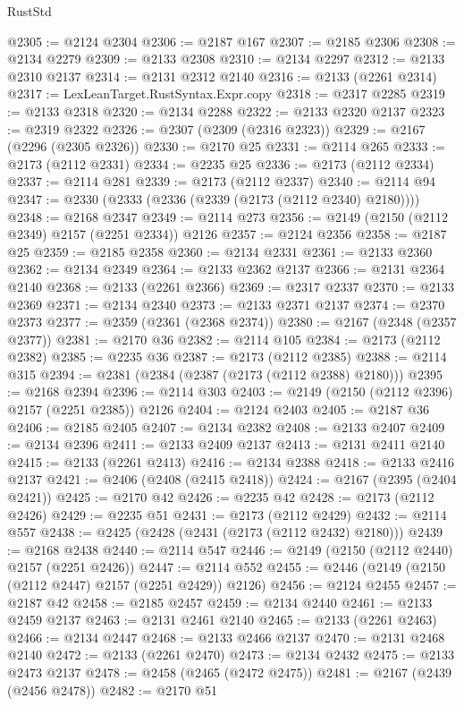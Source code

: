 \begin{lexlean}{RustStd}
\begin{coremodule}
{\begin{coremodule}
{{{{{{{{{{{{{{{{@2305 := @2124 @2304
@2306 := @2187 @167
@2307 := @2185 @2306
@2308 := @2134 @2279
@2309 := @2133 @2308
@2310 := @2134 @2297
@2312 := @2133 @2310 @2137
@2314 := @2131 @2312 @2140
@2316 := @2133 (@2261 @2314)
@2317 := LexLeanTarget.RustSyntax.Expr.copy
@2318 := @2317 @2285
@2319 := @2133 @2318
@2320 := @2134 @2288
@2322 := @2133 @2320 @2137
@2323 := @2319 @2322
@2326 := @2307 (@2309 (@2316 @2323))
@2329 := @2167 (@2296 (@2305 @2326))
@2330 := @2170 @25
@2331 := @2114 @265
@2333 := @2173 (@2112 @2331)
@2334 := @2235 @25
@2336 := @2173 (@2112 @2334)
@2337 := @2114 @281
@2339 := @2173 (@2112 @2337)
@2340 := @2114 @94
@2347 := @2330 (@2333 (@2336 (@2339 (@2173 (@2112 @2340) @2180))))
@2348 := @2168 @2347
@2349 := @2114 @273
@2356 := @2149 (@2150 (@2112 @2349) @2157 (@2251 @2334)) @2126
@2357 := @2124 @2356
@2358 := @2187 @25
@2359 := @2185 @2358
@2360 := @2134 @2331
@2361 := @2133 @2360
@2362 := @2134 @2349
@2364 := @2133 @2362 @2137
@2366 := @2131 @2364 @2140
@2368 := @2133 (@2261 @2366)
@2369 := @2317 @2337
@2370 := @2133 @2369
@2371 := @2134 @2340
@2373 := @2133 @2371 @2137
@2374 := @2370 @2373
@2377 := @2359 (@2361 (@2368 @2374))
@2380 := @2167 (@2348 (@2357 @2377))
@2381 := @2170 @36
@2382 := @2114 @105
@2384 := @2173 (@2112 @2382)
@2385 := @2235 @36
@2387 := @2173 (@2112 @2385)
@2388 := @2114 @315
@2394 := @2381 (@2384 (@2387 (@2173 (@2112 @2388) @2180)))
@2395 := @2168 @2394
@2396 := @2114 @303
@2403 := @2149 (@2150 (@2112 @2396) @2157 (@2251 @2385)) @2126
@2404 := @2124 @2403
@2405 := @2187 @36
@2406 := @2185 @2405
@2407 := @2134 @2382
@2408 := @2133 @2407
@2409 := @2134 @2396
@2411 := @2133 @2409 @2137
@2413 := @2131 @2411 @2140
@2415 := @2133 (@2261 @2413)
@2416 := @2134 @2388
@2418 := @2133 @2416 @2137
@2421 := @2406 (@2408 (@2415 @2418))
@2424 := @2167 (@2395 (@2404 @2421))
@2425 := @2170 @42
@2426 := @2235 @42
@2428 := @2173 (@2112 @2426)
@2429 := @2235 @51
@2431 := @2173 (@2112 @2429)
@2432 := @2114 @557
@2438 := @2425 (@2428 (@2431 (@2173 (@2112 @2432) @2180)))
@2439 := @2168 @2438
@2440 := @2114 @547
@2446 := @2149 (@2150 (@2112 @2440) @2157 (@2251 @2426))
@2447 := @2114 @552
@2455 := @2446 (@2149 (@2150 (@2112 @2447) @2157 (@2251 @2429)) @2126)
@2456 := @2124 @2455
@2457 := @2187 @42
@2458 := @2185 @2457
@2459 := @2134 @2440
@2461 := @2133 @2459 @2137
@2463 := @2131 @2461 @2140
@2465 := @2133 (@2261 @2463)
@2466 := @2134 @2447
@2468 := @2133 @2466 @2137
@2470 := @2131 @2468 @2140
@2472 := @2133 (@2261 @2470)
@2473 := @2134 @2432
@2475 := @2133 @2473 @2137
@2478 := @2458 (@2465 (@2472 @2475))
@2481 := @2167 (@2439 (@2456 @2478))
@2482 := @2170 @51
}}}}}}}}}}}}}}}}
\end{coremodule}}
\end{coremodule}
\end{lexlean}
